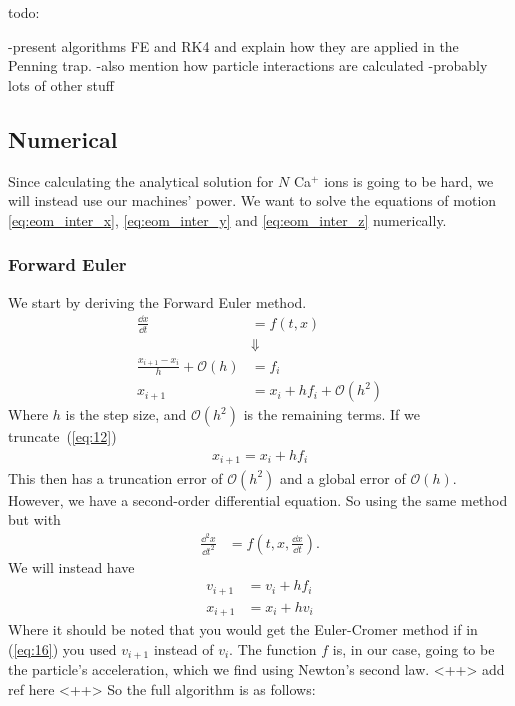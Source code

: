 todo:

-present algorithms FE and RK4 and explain how they are applied in
the Penning trap.\linebreak
-also mention how particle interactions are calculated \linebreak
-probably lots of other stuff
\\



\subsection{Numerical}
Since calculating the analytical solution for $N$ Ca$^{+}$ ions is going to be hard,
we will instead use our machines' power. We want to solve the equations of motion
\ref{eq:eom_inter_x}, \ref{eq:eom_inter_y} and \ref{eq:eom_inter_z} numerically.

\subsubsection{Forward Euler} \label{sec:forward-euler}
We start by deriving the Forward Euler method.
\begin{align}
  \frac{\dd{x}}{\dd{t}} &= f(t, x)\\
  &\Downarrow\nonumber\\
  \frac{x_{i+1}  - x_{i}}{h} + \mathcal{O}(h) &= f_{i}\\
  x_{i+1} &= x_{i} + hf_{i} + \mathcal{O}(h^{2}) \label{eq:12}
\end{align}
Where $h$ is the step size, and $\mathcal{O}(h^{2})$ is the remaining terms.
If we truncate~(\ref{eq:12})
\begin{align}
  x_{i+1} = x_{i} + hf_{i} \label{eq:13}
\end{align}
This then has a truncation error of $\mathcal{O}(h^{2})$ and a global error of $\mathcal{O}(h)$.
However, we have a second-order differential equation. So using the same method but with
\begin{align}
  \frac{\dd^{2}{x}}{\dd{t^{2}}} &= f\left(t, x, \frac{\dd{x}}{\dd{t}}\right).
\end{align}
We will instead have
\begin{align}
  v_{i+1} &= v_{i} + hf_{i}\label{eq:14}\\
  x_{i+1} &= x_{i} + hv_{i} \label{eq:16}
\end{align}
Where it should be noted that you would get the Euler-Cromer method if in (\ref{eq:16}) you used $v_{i+1}$ instead of $v_{i}$.
The function $f$ is, in our case, going to be the particle's acceleration, which we find using Newton's second law. <++> add ref here <++>
So the full algorithm is as follows:

